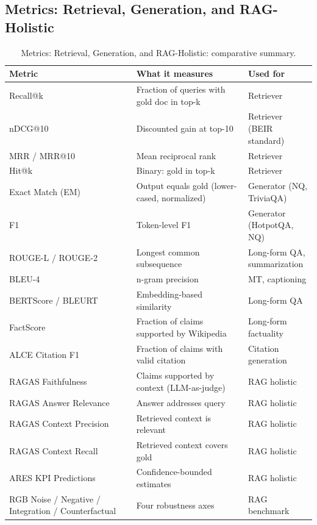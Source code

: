 \documentclass{article}
\begin{document}
\subsection{Metrics: Retrieval, Generation, and RAG-Holistic}\label{metrics-retrieval-generation-and-rag-holistic}

\begin{table}[t]
\centering
\caption{Metrics: Retrieval, Generation, and RAG-Holistic: comparative summary.}
\label{tab:metrics-retrieval-generation-and-rag-holistic}
\begin{tabular}{>{\raggedright\arraybackslash}p{0.4180\linewidth}
  >{\raggedright\arraybackslash}p{0.3607\linewidth}
  >{\raggedright\arraybackslash}p{0.2213\linewidth}}
\toprule
Metric & What it measures & Used for \\
\midrule
Recall@k & Fraction of queries with gold doc in top-k & Retriever \\
nDCG@10 & Discounted gain at top-10 & Retriever (BEIR standard) \\
MRR / MRR@10 & Mean reciprocal rank & Retriever \\
Hit@k & Binary: gold in top-k & Retriever \\
Exact Match (EM) & Output equals gold (lower-cased, normalized) & Generator (NQ, TriviaQA) \\
F1 & Token-level F1 & Generator (HotpotQA, NQ) \\
ROUGE-L / ROUGE-2 & Longest common subsequence & Long-form QA, summarization \\
BLEU-4 & n-gram precision & MT, captioning \\
BERTScore / BLEURT & Embedding-based similarity & Long-form QA \\
FactScore & Fraction of claims supported by Wikipedia & Long-form factuality \\
ALCE Citation F1 & Fraction of claims with valid citation & Citation generation \\
RAGAS Faithfulness & Claims supported by context (LLM-as-judge) & RAG holistic \\
RAGAS Answer Relevance & Answer addresses query & RAG holistic \\
RAGAS Context Precision & Retrieved context is relevant & RAG holistic \\
RAGAS Context Recall & Retrieved context covers gold & RAG holistic \\
ARES KPI Predictions & Confidence-bounded estimates & RAG holistic \\
RGB Noise / Negative / Integration / Counterfactual & Four robustness axes & RAG benchmark \\
\end{tabular}
\end{table}
\end{document}
